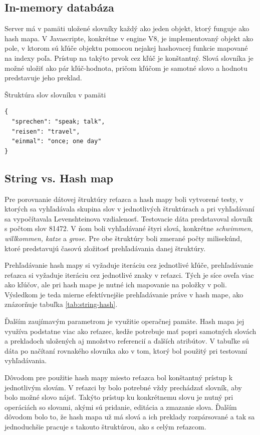 \documentclass[
  digital, %
  table,   %
  lof,     %
  lot,     %
]{fithesis3}
\begin{document}
\subsection{In-memory databáza} \label{sec:inmemorydb}
Server má v pamäti uložené slovníky každý ako jeden objekt, ktorý funguje ako hash mapa. V Javascripte, konkrétne v engine V8, je implementovaný objekt ako pole, v ktorom sú kľúče objektu pomocou nejakej hashovacej funkcie mapované na indexy poľa. Prístup na takýto prvok cez kľúč je konštantný. Slová slovníka je možné uložiť ako pár kľúč-hodnota, pričom kľúčom je samotné slovo a hodnotu predstavuje jeho preklad.

\begin{exmp}
Štruktúra slov slovníku v pamäti
\centering
\begin{lstlisting}[basicstyle=\small]
{
  "sprechen": "speak; talk",
  "reisen": "travel",
  "einmal": "once; one day"
}
\end{lstlisting}
\end{exmp}

\subsection{String vs. Hash map}
Pre porovnanie dátovej štruktúry reťazca a hash mapy boli vytvorené testy, v ktorých sa vyhľadávala skupina slov v jednotlivých štruktúrach a pri vyhľadávaní sa vypočítavala Levenshteinova vzdialenosť. Testovacie dáta predstavoval slovník s počtom slov 81472. V ňom boli vyhľadávané štyri slová, konkrétne \textit{schwimmen, willkommen, katze} a \textit{grose}. Pre obe štruktúry boli zmerané počty milisekúnd, ktoré predstavujú časovú zložitosť prehľadávania danej štruktúry.

Prehľadávanie hash mapy si vyžaduje iteráciu cez jednotlivé kľúče, prehľadávanie reťazca si vyžaduje iteráciu cez jednotlivé znaky v reťazci. Tých je síce oveľa viac ako kľúčov, ale pri hash mape je nutné ich mapovanie na položky v poli. Výsledkom je teda mierne efektívnejšie prehľadávanie práve v hash mape, ako znázorňuje tabuľka \ref{tab:string-hash}.

Ďalším zaujímavým parametrom je využitie operačnej pamäte. Hash mapa jej využíva podstatne viac ako reťazec, kedže potrebuje mať popri samotných slovách a prekladoch uložených aj množstvo referencií a ďalších atribútov. V tabuľke sú dáta po načítaní rovnakého slovníka ako v tom, ktorý bol použitý pri testovaní vyhľadávania.

Dôvodom pre použitie hash mapy miesto reťazca bol konštantný prístup k jednotlivým slovám. V reťazci by bolo potrebné vždy prechádzať slovník, aby bolo možné slovo nájsť. Takýto prístup ku konkrétnemu slovu je nutný pri operáciách so slovami, akými sú pridanie, editácia a zmazanie slova. Ďalším dôvodom bolo to, že hash mapa už má slová a ich preklady rozpársované a tak sa jednoduchšie pracuje s takouto štruktúrou, ako s celým reťazcom. 
\end{document}
